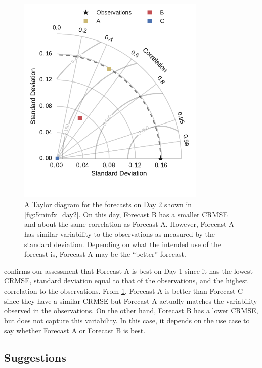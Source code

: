 \begin{figure}[p]
\centering
\includegraphics[width=0.8\textwidth]{figs/taylor_Day_2.pdf}
\vspace{-3em}
\caption[Taylor diagram for day 2 example forecasts]{A Taylor diagram
  for the forecasts on Day 2 shown in \cref{fig:5minfx_day2}. On this
  day, Forecast B has a smaller CRMSE and about the same correlation
  as Forecast A. However, Forecast A has similar variability to the
  observations as measured by the standard deviation. Depending on
  what the intended use of the forecast is, Forecast A may be the
  ``better'' forecast.}
\label{fig:taylor_day2}
\end{figure}

 confirms our assessment that Forecast A is best
on Day 1 since it has the lowest CRMSE, standard deviation equal to
that of the observations, and the highest correlation to the
observations.
From \cref{fig:taylor_day2}, Forecast A is better than Forecast C
since they have a similar CRMSE but Forecast A actually matches the
variability observed in the observations.
On the other hand, Forecast B has a lower CRMSE, but does not capture
this variability.
In this case, it depends on the use case to say whether Forecast A or
Forecast B is best.

\subsection{Suggestions}

